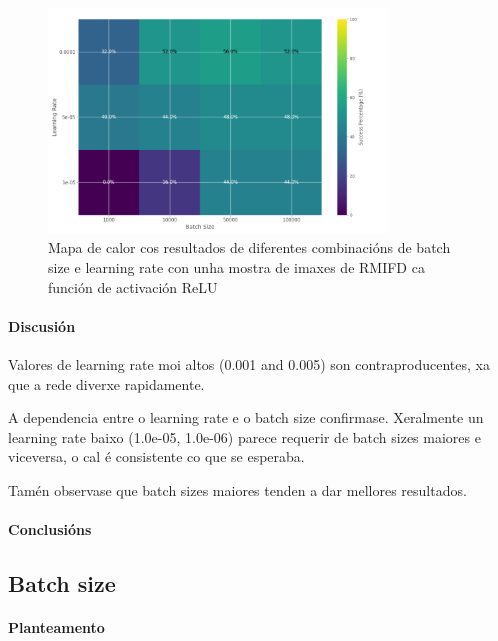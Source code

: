\begin{figure}[ht]
    \centering
    \includegraphics[width=0.8\textwidth]{imaxes/e_heatmap_MLP_RFMID.png}
    \caption{Mapa de calor cos resultados de diferentes combinacións de batch size e learning rate con unha mostra de imaxes de RMIFD ca función de activación ReLU}
    \label{fig:e_heatmap_MLP_RFMID}
\end{figure}

\paragraph{Discusión}
\label{par:Discusion-learningrate}

Valores de learning rate moi altos (0.001 and 0.005) son contraproducentes, xa que a rede diverxe rapidamente.

A dependencia entre o learning rate e o batch size confirmase. Xeralmente un learning rate baixo (1.0e-05, 1.0e-06) parece requerir de batch sizes maiores e viceversa, o cal é consistente co que se esperaba.

Tamén observase que batch sizes maiores tenden a dar mellores resultados.

\paragraph{Conclusións}
\label{par:Conclusions-learningrate}

\subsection{Batch size}
\label{subsec:Batch size}

\paragraph{Planteamento}
\label{par:Planteamento-batchsize}

